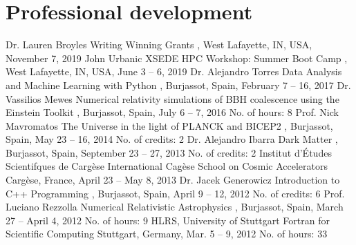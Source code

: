 \section{Professional development}

%
{Dr. Lauren Broyles}%
{Writing Winning Grants}%
{}%
{\Purdue, West Lafayette, IN, USA, November 7, 2019}%
{}
%
{John Urbanic}%
{XSEDE HPC Workshop: Summer Boot Camp}%
{}%
{\Purdue, West Lafayette, IN, USA, June 3 -- 6, 2019}%
{}
%
{Dr. Alejandro Torres}%
{Data Analysis and Machine Learning with Python}%
{}%
{\UVval, Burjassot, Spain, February 7 -- 16, 2017}%
{}
%
{Dr. Vassilios Mewes}%
{Numerical relativity simulations of BBH coalescence using the Einstein Toolkit}%
{}%
{\UVval, Burjassot, Spain, July 6 -- 7, 2016}%
{No. of hours: 8}
%
{Prof. Nick Mavromatos}%
{The Universe in the light of PLANCK and BICEP2}%
{}%
{\UVval, Burjassot, Spain, May 23 -- 16, 2014}%
{No. of credits: 2}
%
{Dr. Alejandro Ibarra}%
{Dark Matter}%
{}%
{\UVval, Burjassot, Spain, September 23 -- 27, 2013}
{No. of credits: 2}
%
{Institut d'Études Scientifques de Cargèse}%
{International Cagèse School on Cosmic Accelerators}%
{}%
{Cargèse, France, April 23 -- May 8, 2013}%
{}
%
{Dr. Jacek Generowicz}%
{Introduction to C++ Programming}%
{}%
{\UVval, Burjassot, Spain, April 9 -- 12, 2012}%
{No. of credits: 6}
%
{Prof. Luciano Rezzolla}%
{Numerical Relativistic Astrophysics}%
{}%
{\UVval, Burjassot, Spain, March 27 -- April 4, 2012}%
{No. of hours: 9}
%
{HLRS, University of Stuttgart}%
{Fortran for Scientific Computing}%
{}%
{Stuttgart, Germany, Mar. 5 -- 9, 2012}%
{No. of hours: 33}
